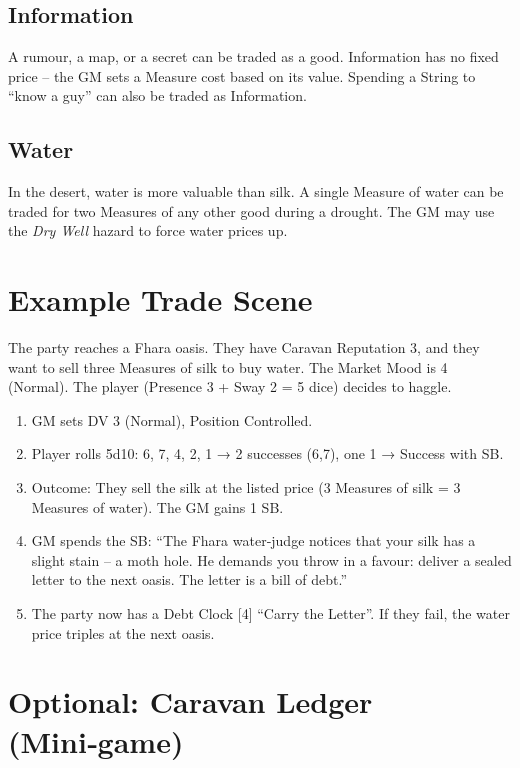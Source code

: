 \documentclass[11pt]{book}
\begin{document}
\subsection{Information}
A rumour, a map, or a secret can be traded as a good. Information has no fixed price – the GM sets a Measure cost based on its value. Spending a String to “know a guy” can also be traded as Information.

\subsection{Water}
In the desert, water is more valuable than silk. A single Measure of water can be traded for two Measures of any other good during a drought. The GM may use the \textit{Dry Well} hazard to force water prices up.

\section{Example Trade Scene}

The party reaches a Fhara oasis. They have Caravan Reputation 3, and they want to sell three Measures of silk to buy water. The Market Mood is 4 (Normal). The player (Presence 3 + Sway 2 = 5 dice) decides to haggle.

\begin{enumerate}
    \item GM sets DV 3 (Normal), Position Controlled.
    \item Player rolls 5d10: 6, 7, 4, 2, 1 → 2 successes (6,7), one 1 → Success with SB.
    \item Outcome: They sell the silk at the listed price (3 Measures of silk = 3 Measures of water). The GM gains 1 SB.
    \item GM spends the SB: “The Fhara water‑judge notices that your silk has a slight stain – a moth hole. He demands you throw in a favour: deliver a sealed letter to the next oasis. The letter is a bill of debt.”
    \item The party now has a Debt Clock [4] “Carry the Letter”. If they fail, the water price triples at the next oasis.
\end{enumerate}

\section{Optional: Caravan Ledger (Mini‑game)}
\end{document}
